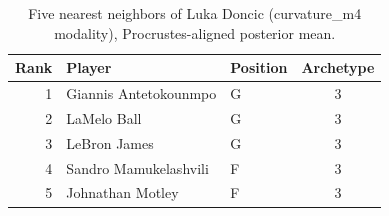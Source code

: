 \begin{table}[htbp]
  \centering\small
  \begin{tabular}{rllc}
    \toprule
    Rank & Player & Position & Archetype \\
    \midrule
    1 & Giannis Antetokounmpo & G & 3 \\
    2 & LaMelo Ball & G & 3 \\
    3 & LeBron James & G & 3 \\
    4 & Sandro Mamukelashvili & F & 3 \\
    5 & Johnathan Motley & F & 3 \\
    \bottomrule
  \end{tabular}
  \caption{Five nearest neighbors of Luka Doncic (curvature_m4 modality), Procrustes-aligned posterior mean.}
  \label{tab:Luka_Doncic_neighbors_curvature_m4}
\end{table}

